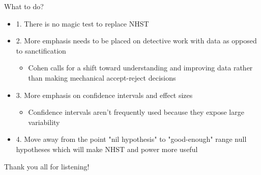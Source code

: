\documentclass[aspectratio=169, 12pt]{beamer}
\begin{document}
\begin{frame}{What to do?}
  \begin{itemize}
  \item 1. There is no magic test to replace NHST
  \item 2. More emphasis needs to be placed on detective work with data as opposed to sanctification
  \begin{itemize}
  \item Cohen calls for a shift toward understanding and improving data rather than making mechanical accept-reject decisions
  \end{itemize}
  \item 3. More emphasis on confidence intervals and effect sizes %
  \begin{itemize}
  \item Confidence intervals aren't frequently used because they expose large variability
  \end{itemize}
  \item 4. Move away from the point "nil hypothesis" to "good-enough" range null hypotheses which will make NHST and power more useful %
  \end{itemize}
\end{frame}

\begin{frame}{}
  \begin{itemize}
    \centering
    {\Huge Thank you all for listening!}
  \end{itemize}
 \end{frame}
\end{document}
